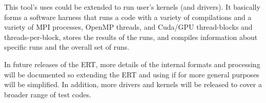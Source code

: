 This tool's uses could be extended to run user's kernels (and drivers).  It
basically forms a software harness that runs a code with a variety of
compilations and a variety of MPI processes, OpenMP threads, and Cuda/GPU
thread-blocks and threads-per-block, stores the results of the runs, and
compiles information about specific runs and the overall set of runs.

In future releases of the ERT, more details of the internal formats and
processing will be documented so extending the ERT and using if for more
general purposes will be simplified.  In addition, more drivers and kernels
will be released to cover a broader range of test codes.
